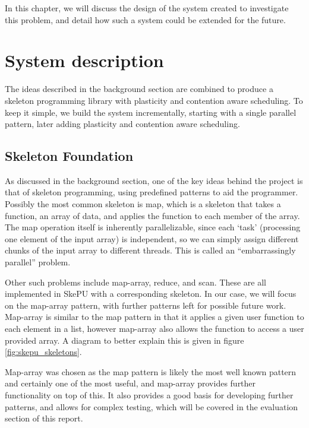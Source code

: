 
In this chapter, we will discuss the design of the system created to investigate this problem, and detail how such a system could be extended for the future.



\section{System description}

The ideas described in the background section are combined to produce a skeleton programming library with plasticity and contention aware scheduling. To keep it simple, we build the system incrementally, starting with a single parallel pattern, later adding plasticity and contention aware scheduling. 



\subsection{Skeleton Foundation}
\label{section:design_skeleton_foundation}

As discussed in the background section, one of the key ideas behind the project is that of skeleton programming, using predefined patterns to aid the programmer. Possibly the most common skeleton is map, which is a skeleton that takes a function, an array of data, and applies the function to each member of the array. The map operation itself is inherently parallelizable, since each `task' (processing one element of the input array) is independent, so we can simply assign different chunks of the input array to different threads. This is called an ``embarrassingly parallel'' problem. 

Other such problems include map-array, reduce, and scan. These are all implemented in SkePU with a corresponding skeleton. In our case, we will focus on the map-array pattern, with further patterns left for possible future work. Map-array is similar to the map pattern in that it applies a given user function to each element in a list, however map-array also allows the function to access a user provided array. A diagram to better explain this is given in figure \ref{fig:skepu_skeletons}.

Map-array was chosen as the map pattern is likely the most well known pattern and certainly one of the most useful, and map-array provides further functionality on top of this. It also provides a good basis for developing further patterns, and allows for complex testing, which will be covered in the evaluation section of this report.



